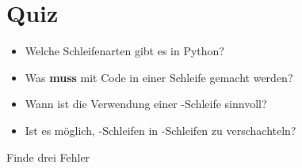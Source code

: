 \section{Quiz}
\begin{frame}
	\slidehead

	\begin{itemize}
		\item Welche Schleifenarten gibt es in Python?\pause
		\item Was \textbf{muss} mit Code in einer Schleife gemacht werden?\pause
		\item Wann ist die Verwendung einer -Schleife sinnvoll?\pause
		\item Ist es möglich, -Schleifen in -Schleifen zu verschachteln?\pause
	\end{itemize}

	\begin{block}{Finde drei Fehler}
	\end{block}
\end{frame}


